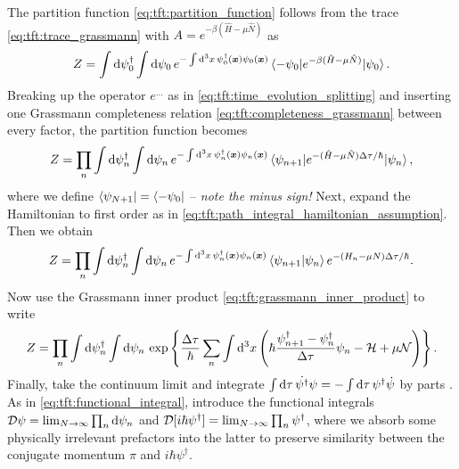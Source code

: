 The partition function \eqref{eq:tft:partition_function} follows from the trace \eqref{eq:tft:trace_grassmann} with $A = e^{-\beta (\hat{H} - \mu \hat{N})}$ as
\begin{equation}
	Z = \int \mathop{}\!\mathrm{d} \psi_0^\dagger \int \mathop{}\!\mathrm{d} \psi_0 \, e^{-\int \mathop{}\!\mathrm{d}^3 x \, \psi_{0}^\dagger({\bm{x}}) \psi_{0}({\bm{x}})} \braket{-\psi_0 | e^{-\beta(\hat{H} - \mu \hat{N})} | \psi_0} .
\end{equation}
Breaking up the operator $e^{\ldots}$ as in \cref{eq:tft:time_evolution_splitting} and inserting one Grassmann completeness relation \eqref{eq:tft:completeness_grassmann} between every factor, the partition function becomes
\begin{equation}
	Z = \prod_n \int \mathop{}\!\mathrm{d} \psi_n^\dagger \int \mathop{}\!\mathrm{d} \psi_n \, e^{-\int \mathop{}\!\mathrm{d}^3 x \, \psi_{n}^\dagger({\bm{x}}) \psi_{n}({\bm{x}})} \braket{\psi_{n+1} | e^{-(\hat{H} - \mu \hat{N}) \Delta \tau / \hbar} | \psi_n} ,
\end{equation}
where we define $\bra{\psi_{N+1}} = \bra{-\psi_0}$ -- \emph{note the minus sign!}
Next, expand the Hamiltonian to first order as in \cref{eq:tft:path_integral_hamiltonian_assumption}.
Then we obtain
\begin{equation}
	Z = \prod_n \int \mathop{}\!\mathrm{d} \psi_n^\dagger \int \mathop{}\!\mathrm{d} \psi_n \, e^{-\int \mathop{}\!\mathrm{d}^3 x \, \psi_{n}^\dagger({\bm{x}}) \psi_{n}({\bm{x}})} \braket{\psi_{n+1} | \psi_n} e^{-(H_n - \mu N) \Delta \tau / \hbar} .
\end{equation}
Now use the Grassmann inner product \eqref{eq:tft:grassmann_inner_product} to write
\begin{equation}
	Z = \prod_n \int \mathop{}\!\mathrm{d} \psi_n^\dagger \int \mathop{}\!\mathrm{d} \psi_n \, \exp \left\{ \frac{\Delta \tau}{\hbar} \sum_n \int \mathop{}\!\mathrm{d}^3 x \left( \hbar \frac{\psi^\dagger_{n+1} - \psi^\dagger_n}{\Delta \tau} \psi_{n} - \mathcal{H} + \mu \mathcal{N} \right) \right\} .
\end{equation}
Finally, take the continuum limit and integrate $\int \mathop{}\!\mathrm{d} \tau \, \dot{\psi^\dagger} \psi = -\int \mathop{}\!\mathrm{d} \tau \, \psi^\dagger \dot{\psi}$ by parts .
As in \eqref{eq:tft:functional_integral}, introduce the functional integrals $\mathcal{D} \psi = \lim_{N \rightarrow \infty} \prod_n \mathop{}\!\mathrm{d} \psi_n$ and $\mathcal{D} [i \hbar \psi^\dagger] = \lim_{N \rightarrow \infty} \prod_n \psi^\dagger$, where we absorb some physically irrelevant prefactors into the latter to preserve similarity between the conjugate momentum $\pi$ and $i \hbar \psi^\dagger$. 
